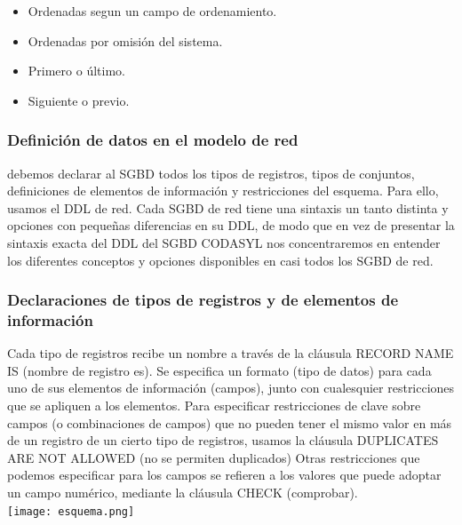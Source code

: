 \documentclass[12pts, A3 ,twosides]{article}
\begin{document}
\begin{itemize}
\item Ordenadas segun un campo de ordenamiento.
\item Ordenadas por omisión del sistema.
\item Primero o último.
\item Siguiente o previo.
\end{itemize}

\subsubsection{Definición de datos en el modelo de red}
debemos declarar al SGBD todos los tipos de registros, tipos de conjuntos, definiciones de elementos de información y restricciones del esquema. Para ello, usamos el DDL de red. Cada SGBD de red tiene una sintaxis un tanto distinta y opciones con pequeñas diferencias en su DDL, de modo que en vez de presentar la sintaxis exacta del DDL del SGBD CODASYL nos concentraremos en entender los diferentes conceptos y opciones disponibles en casi todos los SGBD de red.

\subsubsection{Declaraciones de tipos de registros y de elementos de información}
Cada tipo de registros recibe un nombre a través de la cláusula RECORD NAME IS (nombre de registro es). Se especifica un formato (tipo de datos) para cada uno de sus elementos de información (campos), junto con cualesquier restricciones que se apliquen a los elementos.
Para especificar restricciones de clave sobre campos (o combinaciones de campos) que no pueden tener el mismo valor en más de un registro de un cierto tipo de registros, usamos la cláusula DUPLICATES ARE NOT ALLOWED (no se permiten duplicados)
Otras restricciones que podemos especificar para los campos se refieren a los valores que puede adoptar un campo numérico, mediante la cláusula CHECK (comprobar).\\
\texttt{[image: esquema.png]}\\
\end{document}
